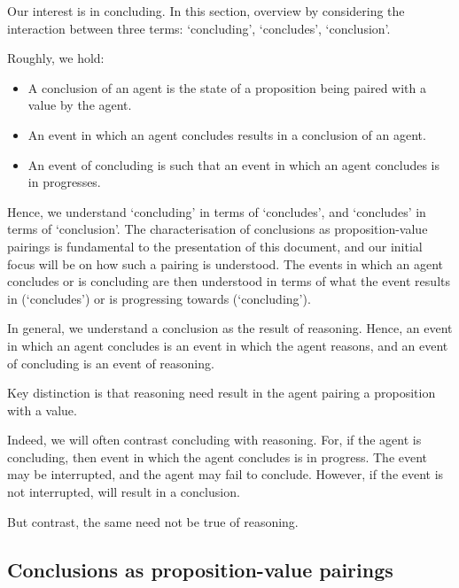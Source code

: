 \begin{note}
  Our interest is in concluding.
  In this section, overview by considering the interaction between three terms:
  `concluding', `concludes', `conclusion'.

  Roughly, we hold:

  \begin{itemize}
  \item
    A conclusion of an agent is the state of a proposition being paired with a value by the agent.
  \item
    An event in which an agent concludes results in a conclusion of an agent.
  \item
    An event of concluding is such that an event in which an agent concludes is in progresses.
  \end{itemize}

  Hence, we understand `concluding' in terms of `concludes', and `concludes' in terms of `conclusion'.
  The characterisation of conclusions as proposition-value pairings is fundamental to the presentation of this document, and our initial focus will be on how such a pairing is understood.
  The events in which an agent concludes or is concluding are then understood in terms of what the event results in (`concludes') or is progressing towards (`concluding').

  In general, we understand a conclusion as the result of reasoning.
  Hence, an event in which an agent concludes is an event in which the agent reasons, and an event of concluding is an event of reasoning.

  Key distinction is that reasoning need result in the agent pairing a proposition with a value.

  Indeed, we will often contrast concluding with reasoning.
  For, if the agent is concluding, then event in which the agent concludes is in progress.
  The event may be interrupted, and the agent may fail to conclude.
  However, if the event is not interrupted, will result in a conclusion.

  But contrast, the same need not be true of reasoning.
\end{note}

\subsection{Conclusions as proposition-value pairings}
\label{cha:clar:sec:CCC:pvp}

